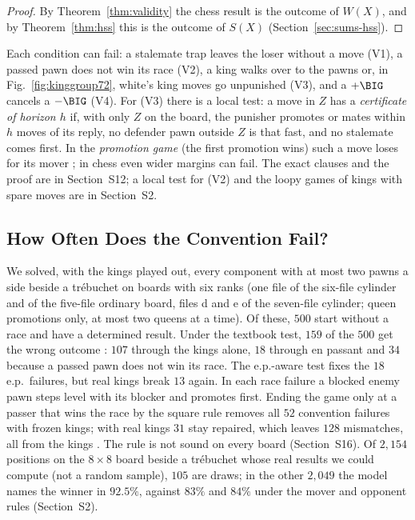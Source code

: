 \begin{proof}
By Theorem~\ref{thm:validity} the chess result is the outcome of $W(X)$, and by Theorem~\ref{thm:hss} this is
the outcome of $S(X)$ (Section~\ref{sec:sums-hss}).
\end{proof}

Each condition can fail: a stalemate trap leaves the loser without a move (V1), a passed pawn does not win its
race (V2), a king walks over to the pawns or, in Fig.~\ref{fig:kinggroup72}, white's king moves go unpunished
(V3), and a $+\BIG$ cancels a $-\BIG$ (V4). For (V3) there is a local test: a move in $Z$ has a
\emph{certificate of horizon $h$} if, with only $Z$ on the board, the punisher promotes or mates within $h$
moves of its reply, no defender pawn outside $Z$ is that fast, and no stalemate comes first. In the \emph{promotion game} (the first
promotion wins) such a move loses for its mover ; in chess even wider margins can fail. The exact clauses and the proof are in Section~S12; a local test for (V2)
and the loopy games of kings with spare moves are in Section~S2.

\subsection{How Often Does the Convention Fail?}\label{sec:kings-sweep}

We solved, with the kings played out, every component with at most two pawns a side beside a tr\'ebuchet on
boards with six ranks (one file of the six-file cylinder and of the five-file ordinary board, files d and e of
the seven-file cylinder; queen promotions only, at most two queens at a time). Of these, $500$ start without a race and have a
determined result. Under the textbook test, $159$ of the $500$ get the wrong outcome : $107$ through
the kings alone, $18$ through en passant and $34$ because a passed pawn does not win its race. The e.p.-aware
test fixes the $18$ e.p.\ failures, but real kings break $13$ again. In each race failure a blocked
enemy pawn steps level with its blocker and promotes first. Ending the game only at a passer
that wins the race by the square rule removes all $52$ convention failures with frozen kings; with real kings
$31$ stay repaired, which leaves $128$ mismatches, all from the kings . The rule is not sound on every
board (Section~S16). Of $2{,}154$ positions on the $8\times8$ board beside a tr\'ebuchet whose real results we could compute (not a random sample), $105$ are
draws; in the other $2{,}049$ the model names the winner in $92.5\%$, against $83\%$ and $84\%$ under the mover
and opponent rules  (Section~S2).
